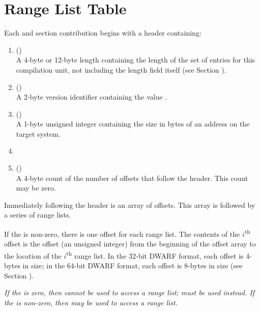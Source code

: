 \section{Range List Table}
\label{app:ranglisttable}
Each \dotdebugrnglists{} and \dotdebugrnglistsdwo{} section 
\bb
contribution
\eb
begins with a header containing:
\begin{enumerate}[1. ]
\item \HFNunitlength{} () \\
A 4-byte or 12-byte length containing the length of
the set of entries for this compilation unit, not
including the length field itself
\bb
(see Section ).
\eb

\item  \HFNversion{} (\HFTuhalf) \\
A 2-byte version identifier containing the value
\versiondotdebugrnglists{}. 

\item	\HFNaddresssize{} (\HFTubyte) \\
A 1-byte unsigned integer containing the size in
bytes of an address 
\db
on the target system.

\item	\HFNreservedwassegmentselectorsize{} 
\db
\\

\item   \HFNoffsetentrycount{} (\HFTuword) \\
A 4-byte count of the number of offsets
that follow the header. This count may be zero.
\end{enumerate}

Immediately following the header is an array of offsets.
This array is followed by a series of range lists. 

If the \HFNoffsetentrycount{} is non-zero, there 
is one offset for each range list. The contents
of the $i$\textsuperscript{th} offset is the offset 
(an unsigned integer) from the
beginning of the offset array to the location of the 
$i$\textsuperscript{th} range list.
In the 32-bit DWARF format, each offset is 4-bytes in size; 
in the 64-bit DWARF format, each offset is 8-bytes in size 
(see Section ).

\textit{If the \HFNoffsetentrycount{} is zero, then \DWFORMrnglistx{} cannot 
be used to access a range list; \DWFORMsecoffset{} must be used 
instead. If the \HFNoffsetentrycount{} is non-zero, then \DWFORMrnglistx{} 
may be used to access a range 
\bb
list.
\eb\db
}

